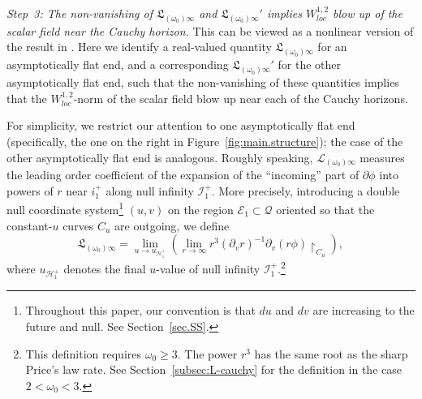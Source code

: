 \documentclass[10pt, reqno]{amsart}
\theoremstyle{definition}
\theoremstyle{remark}
\numberwithin{equation}{section}
\newcommand{\ud}{d}
\newcommand{\rd}{\partial}
\newcommand{\0}{\emptyset}
\newcommand{\omg}{\omega}
\newcommand{\calH}{\mathcal H}
\newcommand{\calI}{\mathcal I}
\newcommand{\calL}{\mathcal L}
\newcommand{\calQ}{\mathcal Q}
\newcommand{\EH}{\calH^{+}}
\newcommand{\pfstep}[1]{\vspace{.5em} {\it \noindent #1.}}
\newcommand{\NI}{\calI^{+}}						%
\newcommand{\Ext}{\mathscr{E}}
\begin{document}
\pfstep{Step~3: The non-vanishing of $\mathfrak L_{(\omg_{0})\infty}$ and $\mathfrak L_{(\omg_{0})\infty}'$ implies $W^{1,2}_{loc}$ blow up of the scalar field near the Cauchy horizon} This can be viewed as a nonlinear version of the result in \cite{LO.instab}. Here we identify a real-valued quantity $\mathfrak L_{(\omg_{0})\infty}$ for an asymptotically flat end, and a corresponding $\mathfrak L_{(\omg_{0})\infty}'$ for the other asymptotically flat end, such that the non-vanishing of these quantities implies that the $W^{1,2}_{loc}$-norm of the scalar field blow up near each of the Cauchy horizons. 

For simplicity, we restrict our attention to one asymptotically flat end (specifically, the one on the right in Figure~\ref{fig:main.structure}); the case of the other asymptotically flat end is analogous. Roughly speaking, $\calL_{(\omg_{0}) \infty}$ measures the leading order coefficient of the expansion of the ``incoming'' part of $\rd \phi$ into powers of $r$ near $i^{+}_{1}$ along null infinity $\NI_{1}$. More precisely, introducing a double null coordinate system\footnote{Throughout this paper, our convention is that $\ud u$ and $\ud v$ are increasing to the future and null. See Section~\ref{sec.SS}.} $(u, v)$ on the region $\Ext_{1} \subset \calQ$ oriented so that the constant-$u$ curves $C_{u}$ are outgoing, we define
\begin{equation*}
	\mathfrak L_{(\omg_{0}) \infty} = \lim_{u \to u_{\EH_{1}}} (\lim_{r \to \infty} r^{3} (\rd_{v} r)^{-1} \rd_{v} (r \phi) \restriction_{C_{u}}),
\end{equation*}
where $u_{\EH_{1}}$ denotes the final $u$-value of null infinity $\NI_{1}$.\footnote{This definition requires $\omg_{0} \geq 3$. The power $r^{3}$ has the same root as the sharp Price's law rate. See Section~\ref{subsec:L-cauchy} for the definition in the case $2 < \omg_{0} < 3$.}
\end{document}
